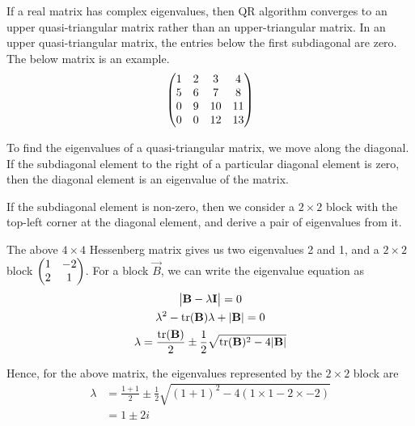 \documentclass{article}
\begin{document}
If a real matrix has complex eigenvalues, then QR algorithm converges to an 
upper quasi-triangular matrix rather than an upper-triangular matrix. In an upper
quasi-triangular matrix, the entries below the first subdiagonal are zero. The below
matrix is an example.
\begin{align}
    \begin{pmatrix}
        1 & 2 & 3 & 4 \\
        5 & 6 & 7 & 8 \\
        0 & 9 & 10 & 11 \\
        0 & 0 & 12 & 13
    \end{pmatrix}
\end{align}

To find the eigenvalues of a quasi-triangular matrix, we move along the diagonal.
If the subdiagonal element to the right of a particular diagonal element is
zero, then the diagonal element is an eigenvalue of the matrix.

If the subdiagonal element is non-zero, then we consider a $2 \times 2$ block
with the top-left corner at the diagonal element, and derive a pair of
eigenvalues from it.

\begin{figure}[h!]
\centering
{}
\end{figure}

The above $4 \times 4$ Hessenberg matrix gives us two eigenvalues 2 and 1,
and a $2 \times 2$ block $\begin{pmatrix}1 & -2 \\ 2 & 1\end{pmatrix}$. For a block $\vec{B}$,
we can write the eigenvalue equation as
\begin{gather}
    \begin{vmatrix}\mathbf{B} - \lambda\mathbf{I}\end{vmatrix} = 0 \\ 
    \lambda^2 - \operatorname{tr}(\mathbf{B})\lambda + |\mathbf{B}| = 0 \\
    \lambda = \frac{\operatorname{tr}(\mathbf{B})}{2} \pm \frac{1}{2}\sqrt{\operatorname{tr}(\mathbf{B})^2 - 4|\mathbf{B}|}
\end{gather}

Hence, for the above matrix, the eigenvalues represented by the $2 \times 2$ block are
\begin{align}
    \lambda &= \frac{1 + 1}{2} \pm \frac{1}{2}\sqrt{(1 + 1)^2 - 4(1\times1 - 2\times-2)} \\
    &= 1 \pm 2i
\end{align}
\end{document}
